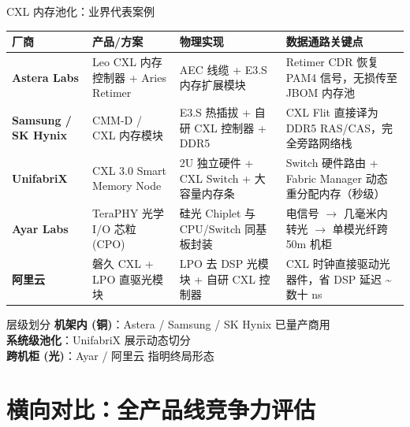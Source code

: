 \documentclass[aspectratio=169, 10pt, UTF8]{ctexbeamer}
\begin{document}
\begin{frame}{CXL 内存池化：业界代表案例}
  \centering
  \footnotesize
  \begin{tabularx}{\textwidth}{p{3.2cm} p{3.2cm} p{3.0cm} p{4.5cm}}
    \toprule
    \textbf{厂商} & \textbf{产品/方案} & \textbf{物理实现} & \textbf{数据通路关键点} \\
    \midrule
    \textbf{Astera Labs}
      & Leo CXL 内存控制器 + Aries Retimer
      & AEC 线缆 + E3.S 内存扩展模块
      & Retimer CDR 恢复 PAM4 信号，无损传至 JBOM 内存池 \\
    \addlinespace
    \textbf{Samsung / SK Hynix}
      & CMM-D / CXL 内存模块
      & E3.S 热插拔 + 自研 CXL 控制器 + DDR5
      & CXL Flit 直接译为 DDR5 RAS/CAS，完全旁路网络栈 \\
    \addlinespace
    \textbf{UnifabriX}
      & CXL 3.0 Smart Memory Node
      & 2U 独立硬件 + CXL Switch + 大容量内存条
      & Switch 硬件路由 + Fabric Manager 动态重分配内存（秒级） \\
    \addlinespace
    \textbf{Ayar Labs}
      & TeraPHY 光学 I/O 芯粒 (CPO)
      & 硅光 Chiplet 与 CPU/Switch 同基板封装
      & 电信号 $\to$ 几毫米内转光 $\to$ 单模光纤跨 50m 机柜 \\
    \addlinespace
    \textbf{阿里云}
      & 磐久 CXL + LPO 直驱光模块
      & LPO 去 DSP 光模块 + 自研 CXL 控制器
      & CXL 时钟直接驱动光器件，省 DSP 延迟 {\textasciitilde}数十 ns \\
    \bottomrule
  \end{tabularx}

  \vspace{6pt}
  \begin{exampleblock}{层级划分}
    \textbf{机架内 (铜)}：Astera / Samsung / SK Hynix 已量产商用 \quad \\
    \textbf{系统级池化}：UnifabriX 展示动态切分 \quad \\
    \textbf{跨机柜 (光)}：Ayar / 阿里云 指明终局形态
  \end{exampleblock}
\end{frame}



\section{横向对比：全产品线竞争力评估}
\end{document}
